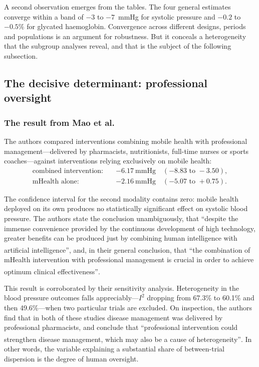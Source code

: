 \documentclass[12pt,a4paper,oneside]{report}
\newcommand{\bq}[1]{``#1''\textsuperscript{\dag}}
\begin{document}
A second observation emerges from the tables. The four general estimates converge within a band of $-3$ to $-7$~mmHg for systolic pressure and $-0.2$ to $-0.5\%$ for glycated haemoglobin. Convergence across different designs, periods and populations is an argument for robustness. But it conceals a heterogeneity that the subgroup analyses reveal, and that is the subject of the following subsection.

\subsection{The decisive determinant: professional oversight}\label{sec:oversight}

\subsubsection{The result from Mao et al.}

The authors compared interventions combining mobile health with professional management---delivered by pharmacists, nutritionists, full-time nurses or sports coaches---against interventions relying exclusively on mobile health:
\begin{align}
  \text{combined intervention:} \quad & -6.17~\text{mmHg} \quad (-8.83 \text{ to } -3.50),\\
  \text{mHealth alone:} \quad & -2.16~\text{mmHg} \quad (-5.07 \text{ to } +0.75).
\end{align}

The confidence interval for the second modality contains zero: mobile health deployed on its own produces no statistically significant effect on systolic blood pressure. The authors state the conclusion unambiguously, that \bq{despite the immense convenience provided by the continuous development of high technology, greater benefits can be produced just by combining human intelligence with artificial intelligence}, and, in their general conclusion, that \bq{the combination of mHealth intervention with professional management is crucial in order to achieve optimum clinical effectiveness}.

This result is corroborated by their sensitivity analysis. Heterogeneity in the blood pressure outcomes falls appreciably---$I^2$ dropping from 67.3\% to 60.1\% and then 49.6\%---when two particular trials are excluded. On inspection, the authors find that in both of these studies disease management was delivered by professional pharmacists, and conclude that \bq{professional intervention could strengthen disease management, which may also be a cause of heterogeneity}. In other words, the variable explaining a substantial share of between-trial dispersion is the degree of human oversight.
\end{document}
